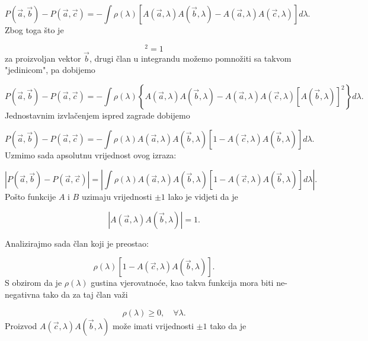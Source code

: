 \begin{equation}
    P(\vec{a}, \vec{b}) - P(\vec{a}, \vec{c})  = - \int \rho (\lambda) [A(\vec{a}, \lambda) A(\vec{b}, \lambda) - A(\vec{a}, \lambda) A(\vec{c}, \lambda) ] d\lambda.
\end{equation}
Zbog toga što je

\begin{equation}
    [A(\vec{b}, \lambda)]^2 = 1
\end{equation}
za proizvoljan vektor $\vec{b}$, drugi član u integrandu možemo pomnožiti sa takvom "jedinicom", pa dobijemo

\begin{equation}
    P(\vec{a}, \vec{b}) - P(\vec{a}, \vec{c})  = - \int \rho (\lambda) \left\{A(\vec{a}, \lambda) A(\vec{b}, \lambda) - A(\vec{a}, \lambda) A(\vec{c}, \lambda)[A(\vec{b}, \lambda)]^2 \right\}d\lambda.
\end{equation}
Jednostavnim izvlačenjem ispred zagrade dobijemo

\begin{equation}
    P(\vec{a}, \vec{b}) - P(\vec{a}, \vec{c})  = - \int \rho (\lambda) A(\vec{a}, \lambda) A(\vec{b}, \lambda) [1- A(\vec{c}, \lambda) A(\vec{b}, \lambda) ] d\lambda.
\end{equation}
Uzmimo sada apsolutnu vrijednost ovog izraza:

\begin{equation}
    \left|{P(\vec{a}, \vec{b}) - P(\vec{a}, \vec{c})}\right| =  \left| \int  \rho (\lambda) A(\vec{a}, \lambda) A(\vec{b}, \lambda) [1- A(\vec{c}, \lambda) A(\vec{b}, \lambda)  ] d\lambda \right|.
\end{equation}
Pošto funkcije $A$ i $B$ uzimaju vrijednosti $\pm 1$ lako je vidjeti da je

\begin{equation}
    \left|A(\vec{a}, \lambda) A(\vec{b}, \lambda)\right| = 1.
\end{equation}

Analizirajmo sada član koji je preostao:

\begin{equation}
    \rho (\lambda)[1 - A(\vec{c}, \lambda) A(\vec{b}, \lambda) ].
\end{equation}
S obzirom da je $\rho(\lambda)$ gustina vjerovatnoće, kao takva funkcija mora biti ne-negativna tako da za taj član važi

\begin{equation}
    \rho(\lambda) \ge0 , \quad \forall \lambda.
\end{equation}
Proizvod $A(\vec{c}, \lambda) A(\vec{b}, \lambda)$ može imati vrijednosti $\pm 1$ tako da je

